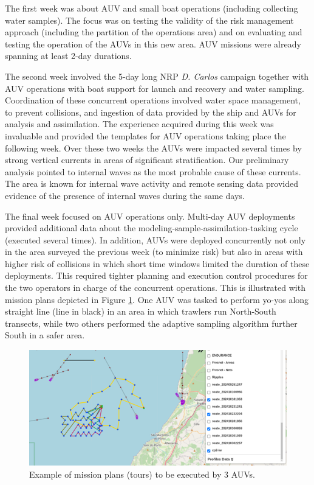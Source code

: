 The first week was about AUV and small boat operations (including
collecting water samples). The focus was on testing the validity of the
risk management approach (including the partition of the operations
area) and on evaluating and testing the operation of the AUVs in this
new area. AUV missions were already spanning at least 2-day durations.

The second week involved the 5-day long NRP \emph{D. Carlos} campaign
together with AUV operations with boat support for launch and recovery
and water sampling. Coordination of these concurrent operations involved
water space management, to prevent collisions, and ingestion of data
provided by the ship and AUVs for analysis and assimilation. The
experience acquired during this week was invaluable and provided the
templates for AUV operations taking place the following week. Over these
two weeks the AUVs were impacted several times by strong vertical
currents in areas of significant stratification. Our preliminary
analysis pointed to internal waves as the most probable cause of these
currents. The area is known for internal wave activity and remote
sensing data provided evidence of the presence of internal waves during
the same days.

The final week focused on AUV operations only. Multi-day AUV deployments
provided additional data about the modeling-sample-assimilation-tasking
cycle (executed several times). In addition, AUVs were deployed
concurrently not only in the area surveyed the previous week (to
minimize risk) but also in areas with higher risk of collisions in which
short time windows limited the duration of these deployments. This
required tighter planning and execution control procedures for the two
operators in charge of the concurrent operations. This is illustrated
with mission plans depicted in Figure \ref{fig:missionplans}. One AUV
was tasked to perform yo-yos along straight line (line in black) in an
area in which trawlers run North-South transects, while two others
performed the adaptive sampling algorithm further South in a safer area.
 
\begin{figure}
    \centering
    \includegraphics[width=.7\linewidth]{fig/missionplans.png}
    \caption{Example of mission plans (tours) to be executed by 3 AUVs.}
    \label{fig:missionplans}
\end{figure}


